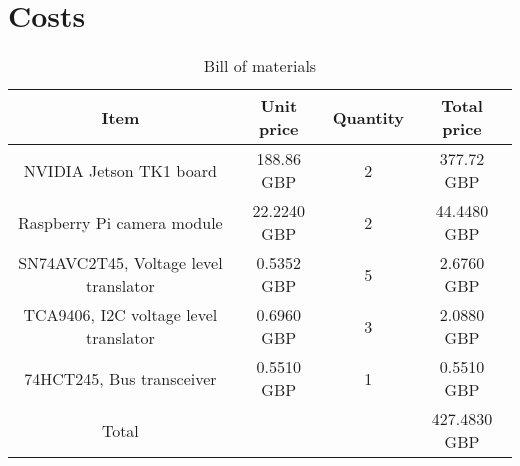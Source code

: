 \chapter{Costs} \label{Appendix:Costs}


\begin{table}[!htb]
  \centering
  \begin{tabular}{|c|c|c|c|}
  \hline
  \textbf{Item} & \textbf{Unit price} & \textbf{Quantity} & \textbf{Total price} \\ \hline
  NVIDIA Jetson TK1 board & 188.86 GBP & 2 & 377.72 GBP \\ \hline
  Raspberry Pi camera module & 22.2240 GBP & 2 & 44.4480 GBP \\ \hline
  SN74AVC2T45, Voltage level translator & 0.5352 GBP & 5 & 2.6760 GBP \\ \hline
  TCA9406, I2C voltage level translator & 0.6960 GBP & 3 & 2.0880 GBP \\ \hline
  74HCT245, Bus transceiver & 0.5510 GBP & 1 & 0.5510 GBP \\ \hline
  Total & & & 427.4830 GBP \\ \hline
  \end{tabular}
  \caption{Bill of materials}
\end{table}

\clearpage
